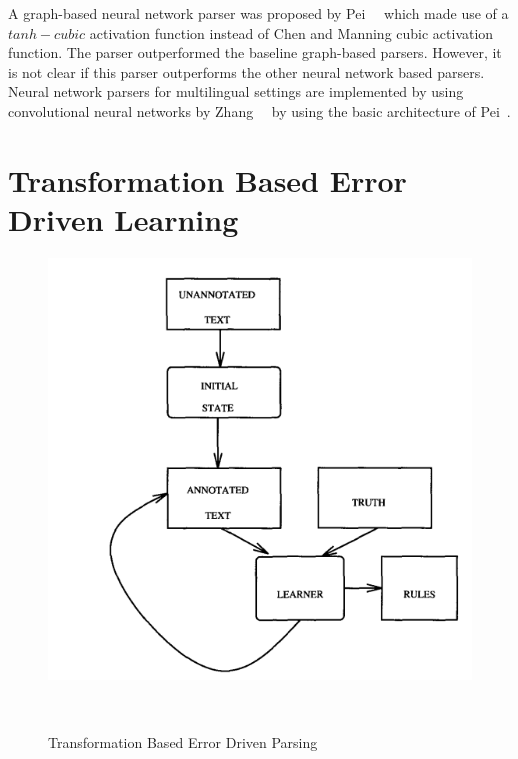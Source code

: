A graph-based neural network parser was proposed by Pei~\etal~\cite{pei2015effective} which made use of a $tanh-cubic$ activation function instead of Chen and Manning cubic activation function. The parser outperformed the baseline graph-based parsers. However, it is not clear if this parser outperforms the other neural network based parsers. Neural network parsers for multilingual settings are implemented by using convolutional neural networks by Zhang~\etal~\cite{zhang2016probabilistic} by using the basic architecture of Pei~\etal.

\section{Transformation Based Error Driven Learning}

\begin{figure}[t!]
\centering
    \includegraphics[scale=0.8]{tbl-brill.png}
\caption{Transformation Based Error Driven Parsing}~\citep{brill1992simple}
\label{tbl:brill}
\end{figure}

